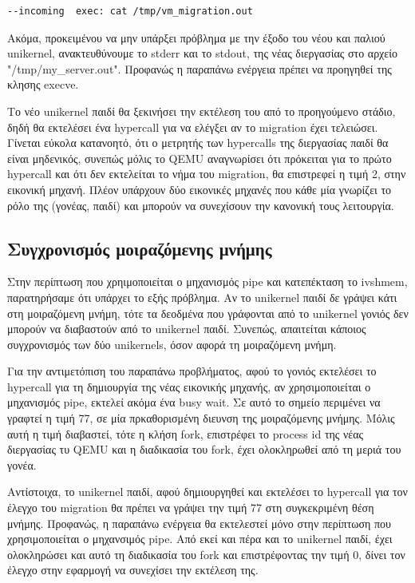 \begin{lstlisting}[numbers=none]
--incoming  exec: cat /tmp/vm_migration.out 
\end{lstlisting}

Ακόμα, προκειμένου να μην υπάρξει πρόβλημα με την έξοδο του νέου και παλιού
unikernel, ανακτευθύνουμε το stderr και το stdout, της νέας διεργασίας στο
αρχείο "/tmp/my\_server.out". Προφανώς η παραπάνω ενέργεια πρέπει να προηγηθεί
της κλησης execve. 

Το νέο unikernel παιδί θα ξεκινήσει την εκτέλεση του από το προηγούμενο στάδιο,
δηδή θα εκτελέσει ένα hypercall για να ελέγξει αν το migration έχει τελειώσει.
Γίνεται εύκολα κατανοητό, ότι ο μετρητής των hypercalls της διεργασίας παιδί θα
είναι μηδενικός, συνεπώς μόλις το QEMU αναγνωρίσει ότι πρόκειται για το πρώτο
hypercall και ότι δεν εκτελείται το νήμα του migration, θα επιστρεφεί η τιμή 2,
στην εικονική μηχανή. Πλέον υπάρχουν δύο εικονικές μηχανές που κάθε μία γνωρίζει
το ρόλο της (γονέας, παιδί) και μπορούν να συνεχίσουν την κανονική τους λειτουργία.

\subsection{Συγχρονισμός μοιραζόμενης μνήμης}

Στην περίπτωση που χρηιμοποιείται ο μηχανισμός pipe και κατεπέκταση το ivshmem,
παρατηρήσαμε ότι υπάρχει το εξής πρόβλημα. Αν το unikernel παιδί δε γράψει κάτι
στη μοιραζόμενη μνήμη, τότε τα δεοδμένα που γράφονται από το unikernel γονιός
δεν μπορούν να διαβαστούν από το unikernel παιδί. Συνεπώς, απαιτείται κάποιος
συγχρονισμός των δύο unikernels, όσον αφορά τη μοιραζόμενη μνήμη. 

Για την αντιμετόπιση του παραπάνω προβλήματος, αφού το  γονιός
εκτελέσει το hypercall για τη δημιουργία της νέας εικονικής μηχανής, αν
χρησιμοποιείται ο μηχανισμός pipe, εκτελεί ακόμα ένα busy wait. Σε αυτό το
σημείο περιμένει να γραφτεί η τιμή 77, σε μία πρκαθορισμένη διευνση της
μοιραζόμενης μνήμης. Μόλις αυτή η τιμή διαβαστεί, τότε η κλήση fork, επιστρέφει
το process id της νέας διεργασίας τυ QEMU και η διαδικασία του fork, έχει
ολοκληρωθεί από τη μεριά του γονέα. 

Αντίστοιχα, το unikernel παιδί, αφού δημιουργηθεί και εκτελέσει το hypercall για
τον έλεγχο του migration θα πρέπει να γράψει την τιμή 77 στη συγκεκριμένη θέση
μνήμης. Προφανώς, η παραπάνω ενέργεια θα εκτελεστεί μόνο στην περίπτωση που
χρησιμοποιείται ο μηχανσιμός pipe. Από εκεί και πέρα και το unikernel παιδί,
έχει ολοκληρώσει και αυτό τη διαδικασία του fork και επιστρέφοντας την τιμή 0,
δίνει τον έλεγχο στην εφαρμογή να συνεχίσει την εκτέλεση της.

